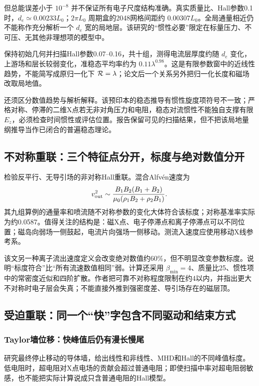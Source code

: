 但总能误差小于 $10^{-8}$ 并不保证所有电子尺度结构准确。真实质量比、Hall参数0.1时，$d_e\simeq0.00233L_0$；$2\pi L_0$ 周期盒的2048网格间距约 $0.00307L_0$。全局通量相近仍不能称作充分解析一个 $d_e$ 宽的局地层。该研究的“惯性必要”限定在标量压力、不可压、无其他非理想项的模型中。

\citet{Andres2016}保持初始几何并扫描Hall参数0.07--0.16，共十组，测得电流层厚度约随 $d_e$ 变化，上游场和层长较弱变化，准稳态平均率约为 $0.11\lambda^{0.98}$。这是有限参数窗中的近线性趋势，不能简写成原归一化下 $\mathcal R=\lambda$；论文后一个关系另外把归一化长度和磁场改取局地值。

还须区分数值趋势与解析解释。该预印本的稳态推导有惯性旋度项符号不一致；严格对称、停滞的二维X点若无非对角压力和电阻，稳态对流惯性不能独自支撑有限 $E_z$，必须检查时间惯性或评估位置。报告保留可见的扫描结果，但不把该局地量纲推导当作已闭合的普遍稳态理论。

\subsection{不对称重联：三个特征点分开，标度与绝对数值分开}
\citet{Cassak2008}检验反平行、无导引场的非对称Hall重联。混合Alfvén速度为
\begin{equation}
v_{\rm out}^2\sim\frac{B_1B_2(B_1+B_2)}{\mu_0(\rho_1B_2+\rho_2B_1)}.
\end{equation}
其九组算例的通量率和喷流随不对称参数的变化大体符合该标度；对称基准率实际为约0.0587。值得关注的结构是：磁X点、电子停滞点和离子停滞点可以不同位置；磁岛向弱场一侧鼓起，电流片向强场一侧移动。测流入速度应使用移动X线参考系。

该文另一种离子流出速度定义会改变绝对数值约60\%，但不明显改变参数标度。说明“标度符合”比“所有流速数值相同”弱。计算还采用 $\beta_{\min}=4$、质量比25、惯性项中的常密度近似和四阶扩散。作者把可靠不对称程度限制在约4以内，并指出更大不对称时电子层会失真；不能直接外推到强密度差、导引场存在的磁层顶。

\subsection{受迫重联：同一个“快”字包含不同驱动和结束方式}
\subsubsection{Taylor墙位移：快峰值后仍有漫长慢尾}
\citet{L057}研究最终停止移动的导体墙，给出线性和非线性、MHD和Hall的不同峰值标度。低电阻时，超电阻对X点电场的贡献会超过普通电阻；即使扫描中率对超电阻弱敏感，也不能把实际计算说成只含普通电阻的Hall模型。

